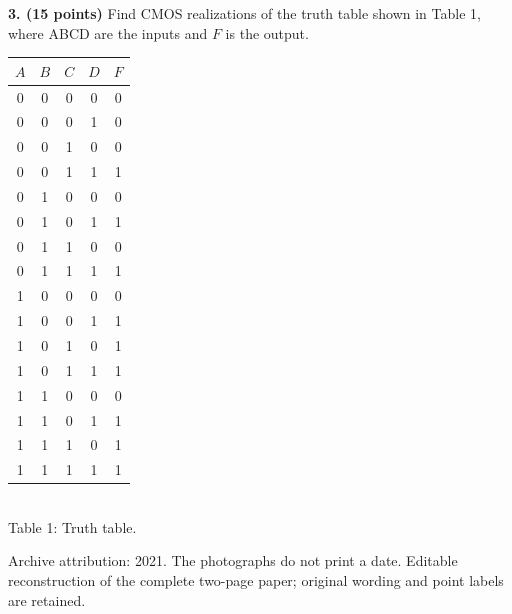 \documentclass[10pt]{article}
\begin{document}
\textbf{3. (15 points)} Find CMOS realizations of the truth table shown in Table 1, where ABCD are the inputs and $F$ is the output.
\begin{center}\begin{tabular}{ccccc}\toprule $A$&$B$&$C$&$D$&$F$\\\midrule
0 & 0 & 0 & 0 & 0\\
0 & 0 & 0 & 1 & 0\\
0 & 0 & 1 & 0 & 0\\
0 & 0 & 1 & 1 & 1\\
0 & 1 & 0 & 0 & 0\\
0 & 1 & 0 & 1 & 1\\
0 & 1 & 1 & 0 & 0\\
0 & 1 & 1 & 1 & 1\\
1 & 0 & 0 & 0 & 0\\
1 & 0 & 0 & 1 & 1\\
1 & 0 & 1 & 0 & 1\\
1 & 0 & 1 & 1 & 1\\
1 & 1 & 0 & 0 & 0\\
1 & 1 & 0 & 1 & 1\\
1 & 1 & 1 & 0 & 1\\
1 & 1 & 1 & 1 & 1\\\bottomrule\end{tabular}\\Table 1: Truth table.\end{center}\vfill\small Archive attribution: 2021. The photographs do not print a date. Editable reconstruction of the complete two-page paper; original wording and point labels are retained.
\newpage
\end{document}
